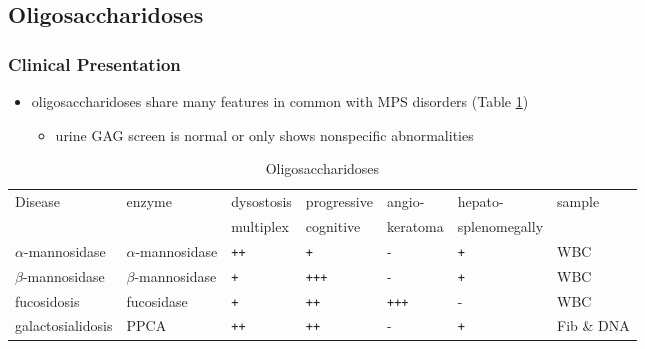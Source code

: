 \documentclass[12pt]{scrartcl}
\begin{document}
\subsection{Oligosaccharidoses}
\label{sec:orga18eba6}
\subsubsection{Clinical Presentation}
\label{sec:org513faef}
\begin{itemize}
\item oligosaccharidoses share many features in common with MPS disorders (Table \ref{tab:org19025ad})
\begin{itemize}
\item urine GAG screen is normal or only shows nonspecific
abnormalities
\end{itemize}
\end{itemize}

\begin{table}[htbp]
\caption{\label{tab:org19025ad}Oligosaccharidoses}
\centering
\begin{tabular}{lllllll}
Disease & enzyme & dysostosis & progressive & angio- & hepato- & sample\\
 &  & multiplex & cognitive & keratoma & splenomegally & \\
\hline
\(\alpha\)-mannosidase & \(\alpha\)-mannosidase & \texttt{++} & \texttt{+} & - & \texttt{+} & WBC\\
\(\beta\)-mannosidase & \(\beta\)-mannosidase & \texttt{+} & \texttt{+++} & - & \texttt{+} & WBC\\
fucosidosis & fucosidase & \texttt{+} & \texttt{++} & \texttt{+++} & - & WBC\\
galactosialidosis & PPCA & \texttt{++} & \texttt{++} & - & \texttt{+} & Fib \& DNA\\
\end{tabular}
\end{table}
\end{document}
